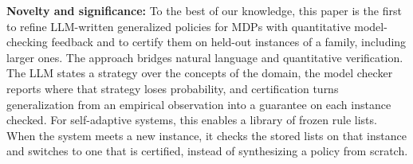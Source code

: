 \textbf{Novelty and significance:}
To the best of our knowledge, this paper is the first to refine LLM-written generalized policies for MDPs with quantitative model-checking feedback and to certify them on held-out instances of a family, including larger ones.
The approach bridges natural language and quantitative verification.
The LLM states a strategy over the concepts of the domain, the model checker reports where that strategy loses probability, and certification turns generalization from an empirical observation into a guarantee on each instance checked.
For self-adaptive systems, this enables a library of frozen rule lists.
When the system meets a new instance, it checks the stored lists on that instance and switches to one that is certified, instead of synthesizing a policy from scratch.
